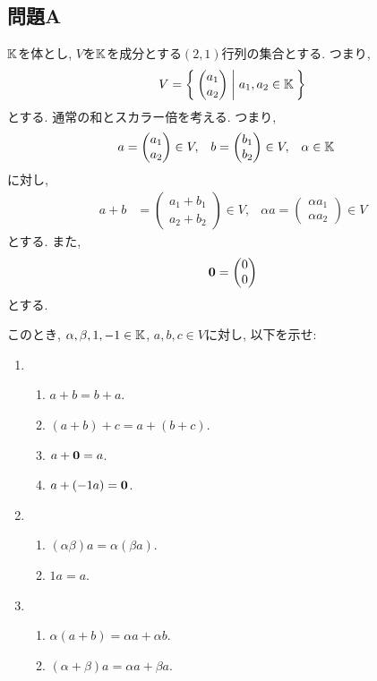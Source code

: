 \subsection{問題A}
\begin{quiz}
  $\mathbb{K}$を体とし, $V$を$\mathbb{K}$を成分とする$(2,1)$行列の集合とする.
  つまり,
  \begin{align*}
    V=\Set{\begin{pmatrix}a_1\\a_2\end{pmatrix}|a_1,a_2\in \mathbb{K}}
  \end{align*}
  とする. 通常の和とスカラー倍を考える.  つまり,
  \begin{align*}
    a&=\begin{pmatrix}a_1\\a_2\end{pmatrix}\in V,&  b&=\begin{pmatrix}b_1\\b_2\end{pmatrix} \in V,
    &\alpha\in\mathbb{K}&
  \end{align*}
  に対し,
  \begin{align*}
    a+b&=\begin{pmatrix}a_1+b_1\\a_2+b_2\end{pmatrix}\in V, & \alpha a=\begin{pmatrix}\alpha a_1\\\alpha a_2\end{pmatrix} \in V
  \end{align*}
  とする. また,
  \begin{align*}
  \boldsymbol{0}=
  \begin{pmatrix}
    0\\0
  \end{pmatrix}
  \end{align*}
  とする.

  このとき, $\alpha,\beta,1,-1\in\mathbb{K}$, $a,b,c\in V$に対し, 以下を示せ:
  \begin{enumerate}
    \item 
    \begin{enumerate}
    \item $a+b=b+a$.
    \item $(a+b)+c=a+(b+c)$.
    \item $a+\boldsymbol{0}=a$.
    \item
      $a+(-1 a)=\boldsymbol{0}$.
    \end{enumerate}
  \item
    \begin{enumerate}
    \item $(\alpha\beta)a=\alpha(\beta a)$.
    \item $1a=a$.
    \end{enumerate}
  \item
    \begin{enumerate}
    \item $\alpha(a+b)=\alpha a+\alpha b$.
    \item $(\alpha+\beta)a=\alpha a+\beta a$.
    \end{enumerate}
  \end{enumerate}
\end{quiz}



